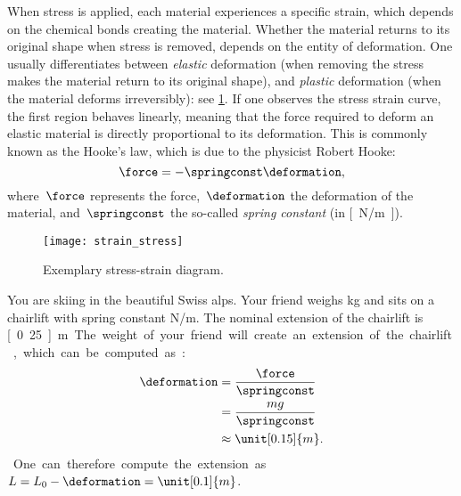     When stress is applied, each material experiences a specific strain, which depends on the chemical bonds creating the material.
    Whether the material returns to its original shape when stress is removed, depends on the entity of deformation.
    One usually differentiates between \emph{elastic} deformation (when removing the stress makes the material return to its original shape), and \emph{plastic} deformation (when the material deforms irreversibly): see \cref{fig:stress_strain}.
    If one observes the stress \vs strain curve, the first region behaves linearly, meaning that the force required to deform an elastic material is directly proportional to its deformation.
    This is commonly known as the Hooke's law, which is due to the physicist Robert Hooke:
    \begin{equation*}
        \force=-\springconst \deformation,
    \end{equation*}
    where~$\force$ represents the force,~$\deformation$ the deformation of the material, and~$\springconst$ the so-called \emph{spring constant} (in \unit[]{[N/m]}).

    \begin{figure}[h]
        \centering
        \texttt{[image: strain\_stress]}
        \caption{Exemplary stress-strain diagram. }
        \label{fig:stress_strain}
    \end{figure}

    \begin{example}
        You are skiing in the beautiful Swiss alps.
        Your friend weighs \unit[100]{kg} and sits on a chairlift with spring constant \unit[4,000]{N/m}.
        The nominal extension of the chairlift is \unit[0.25]{m}.
        The weight of your friend will create an extension of the chairlift, which can be computed as:
        \begin{equation*}
            \begin{aligned}
                \deformation & =\frac{\force}{\springconst} \\
                             & =\frac{mg}{\springconst} \\
                             & \approx \unit[0.15]{m}.
            \end{aligned}
        \end{equation*}
        One can therefore compute the extension as~$L=L_0-\deformation=\unit[0.1]{m}$.
    \end{example}


